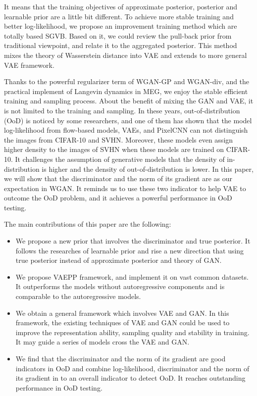 It means that the training objectives of approximate posterior, posterior and learnable prior are a little bit different. To achieve more stable training and better log-likelihood, we propose an improvement training method which are totally based SGVB. Based on it, we could review the pull-back prior from traditional viewpoint, and relate it to the aggregated posterior. This method mixes the theory of Wasserstein distance into VAE and extends to more general VAE framework. 

Thanks to the powerful regularizer term of WGAN-GP and WGAN-div, and the practical implement of Langevin dynamics in MEG, we enjoy the stable efficient training and sampling process. About the benefit of mixing the GAN and VAE, it is not limited to the training and sampling. In these years, out-of-distribution (OoD) is noticed by some researchers, and one of them has shown that the model log-likelihood from flow-based models, VAEs, and PixelCNN can not distinguish the images from CIFAR-10 and SVHN. Moreover, these models even assign higher density to the images of SVHN when these models are trained on CIFAR-10. It challenges the assumption of generative models that the density of in-distribution is higher and the density of out-of-distribution is lower. In this paper, we will show that the discriminator and the norm of its gradient are as our expectation in WGAN. It reminds us to use these two indicator to help VAE to outcome the OoD problem, and it achieves a powerful performance in OoD testing.

The main contributions of this paper are the following:
\begin{itemize}
	\item We propose a new prior that involves the discriminator and true posterior. It follows the researches of learnable prior and rise a new direction that using true posterior instead of approximate posterior and theory of GAN. 
	\item We propose VAEPP framework, and implement it on vast common datasets. It outperforms the models without autoregressive components and is comparable to the autoregressive models. 
	\item We obtain a general framework which involves VAE and GAN. In this framework, the existing techniques of VAE and GAN could be used to improve the representation ability, sampling quality and stability in training. It may guide a series of models cross the VAE and GAN. 
	\item We find that the discriminator and the norm of its gradient are good indicators in OoD and combine log-likelihood, discriminator and the norm of its gradient in to an overall indicator to detect OoD. It reaches outstanding performance in OoD testing.
\end{itemize}
